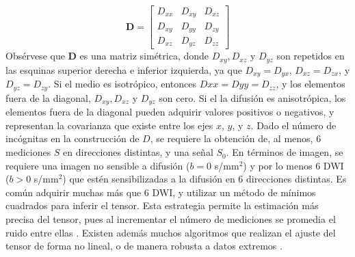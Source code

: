 \begin{equation}
\textbf{D}
=
\begin{bmatrix}
    D_{xx} & D_{xy} & D_{xz} \\
    D_{xy} & D_{yy} & D_{zy} \\
    D_{xz} & D_{yz} & D_{zz}
\end{bmatrix}
\end{equation}
Obsérvese que $\textbf{D}$ es una matriz simétrica, donde $D_{xy}, D_{xz}$ y $D_{yz}$ son repetidos en las esquinas superior derecha e inferior izquierda, ya que $D_{xy} = D_{yx}$, $D_{xz} = D_{zx}$, y $D_{yz} = D_{zy}$. Si el medio es isotrópico, entonces $D{xx} = D{yy} = D_{zz}$, y los elementos fuera de la diagonal, $D_{xy}, D_{xz}$ y $D_{yz}$ son cero.  Si el la difusión es anisotrópica, los elementos fuera de la diagonal pueden adquirir valores positivos o negativos, y representan la covarianza que existe entre los ejes $x$, $y$, y $z$. Dado el número de incógnitas en la construcción de \textbf{$D$}, se requiere la obtención de, al menos, 6 mediciones $S$ en direcciones distintas, y una señal $S_0$. En términos de imagen, se requiere una imagen no sensible a difusión ($b=0$ s/mm$^2$) y por lo menos 6 DWI ($b>0$ s/mm$^2$) que estén sensibilizadas a la difusión en 6 direcciones distintas. Es común adquirir muchas más que 6 DWI, y utilizar un método de mínimos cuadrados para inferir el tensor. Esta estrategia permite la estimación más precisa del tensor, pues al incrementar el número de mediciones se promedia el ruido entre ellas \cite{Jones_2004}. Existen además muchos algoritmos que realizan el ajuste del tensor de forma no lineal, o de manera robusta a datos extremos \cite{chang2005restore,mangin2002distortion}.



